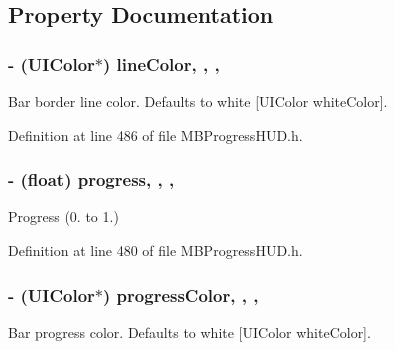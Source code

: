 \subsection{Property Documentation}
\hypertarget{interface_m_b_bar_progress_view_a594029fb5ed62f3de81902c0ea815f2f}{
\subsubsection[{line\+Color}]{\setlength{\rightskip}{0pt plus 5cm}-\/ (U\+I\+Color$\ast$) line\+Color\hspace{0.3cm}{\ttfamily [read]}, {\ttfamily [write]}, {\ttfamily [nonatomic]}, {\ttfamily [assign]}}}\label{interface_m_b_bar_progress_view_a594029fb5ed62f3de81902c0ea815f2f}
Bar border line color. Defaults to white \mbox{[}U\+I\+Color white\+Color\mbox{]}. 

Definition at line 486 of file M\+B\+Progress\+H\+U\+D.\+h.

\hypertarget{interface_m_b_bar_progress_view_aa34865ca266850eb7060e91309f3512b}{
\subsubsection[{progress}]{\setlength{\rightskip}{0pt plus 5cm}-\/ (float) progress\hspace{0.3cm}{\ttfamily [read]}, {\ttfamily [write]}, {\ttfamily [nonatomic]}, {\ttfamily [assign]}}}\label{interface_m_b_bar_progress_view_aa34865ca266850eb7060e91309f3512b}
Progress (0. to 1.) 

Definition at line 480 of file M\+B\+Progress\+H\+U\+D.\+h.

\hypertarget{interface_m_b_bar_progress_view_a5b27bb23bd54ae1c7b37a3fedd817e80}{
\subsubsection[{progress\+Color}]{\setlength{\rightskip}{0pt plus 5cm}-\/ (U\+I\+Color$\ast$) progress\+Color\hspace{0.3cm}{\ttfamily [read]}, {\ttfamily [write]}, {\ttfamily [nonatomic]}, {\ttfamily [assign]}}}\label{interface_m_b_bar_progress_view_a5b27bb23bd54ae1c7b37a3fedd817e80}
Bar progress color. Defaults to white \mbox{[}U\+I\+Color white\+Color\mbox{]}. 

